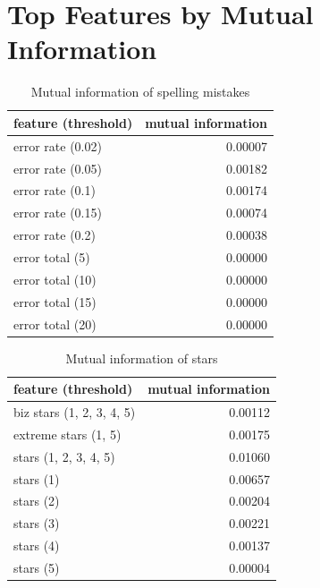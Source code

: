 \chapter{Top Features by Mutual Information}\label{app:mi}



\begin{table}[h!]

\centering
\begin{tabular}{lr}
\toprule
\textbf{feature (threshold)} & \textbf{mutual information} \\
\midrule
error rate (0.02) & 0.00007 \\
error rate (0.05) & 0.00182 \\
error rate (0.1) & 0.00174 \\
error rate (0.15) & 0.00074 \\
error rate (0.2) & 0.00038 \\
error total (5) & 0.00000 \\
error total (10) & 0.00000 \\
error total (15) & 0.00000 \\
error total (20) & 0.00000 \\
\bottomrule
\end{tabular}

\caption{Mutual information of spelling mistakes}\label{tab:mi_errors}
\end{table}

\begin{table}[h!]

\centering
\begin{tabular}{lr}
\toprule
\textbf{feature (threshold)} & \textbf{mutual information} \\
\midrule
biz stars (1, 2, 3, 4, 5) & 0.00112 \\
extreme stars (1, 5) & 0.00175 \\
stars (1, 2, 3, 4, 5)& 0.01060 \\
stars (1) & 0.00657 \\
stars (2) & 0.00204 \\
stars (3) & 0.00221 \\
stars (4) & 0.00137 \\
stars (5) & 0.00004 \\
\bottomrule
\end{tabular}

\caption{Mutual information of stars}\label{tab:mi_stars}
\end{table}

